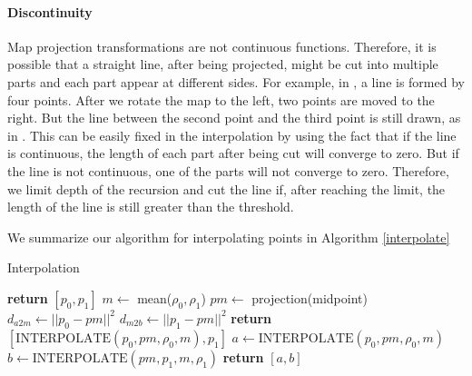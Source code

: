 \paragraph{Discontinuity}

Map projection transformations are not continuous functions. Therefore, it is possible that a straight line, after being projected, might be cut into multiple parts and each part appear at different sides. For example, in , a line is formed by four points. After we rotate the map to the left, two points are moved to the right. But the line between the second point and the third point is still drawn, as in . This can be easily fixed in the interpolation by using the fact that if the line is continuous, the length of each part after being cut will converge to zero. But if the line is not continuous, one of the parts will not converge to zero. Therefore, we limit depth of the recursion and cut the line if, after reaching the limit, the length of the line is still greater than the threshold.




We summarize our algorithm for interpolating points in Algorithm \ref{interpolate}

\begin{algorithm}
  \caption{Interpolation}\label{interpolate}
  \begin{algorithmic}[1]
        \State \textbf{return} $[p_0, p_1]$
      \EndIf
      \State $m \gets$ mean($\rho_0, \rho_1$)
      \State $pm \gets$ projection(midpoint)
      \State $d_{a2m} \gets ||p_0 - pm||^2$
      \State $d_{m2b} \gets ||p_1 - pm||^2$
        \State \textbf{return} $[\text{INTERPOLATE}(p_0, pm, \rho_0, m), p_1]$
      \Else
        \State $a \gets \text{INTERPOLATE}(p_0, pm, \rho_0, m)$
        \State $b \gets \text{INTERPOLATE}(pm, p_1, m, \rho_1)$
        \State \textbf{return} $[a, b]$
      \EndIf
    \EndProcedure
  \end{algorithmic}
\end{algorithm}

